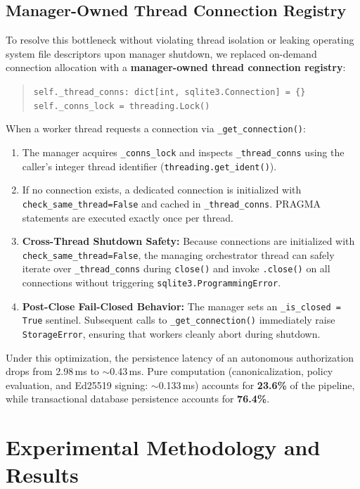\documentclass[sigconf,anonymous,review]{acmart}
\begin{document}
\subsection{Manager-Owned Thread Connection Registry}
To resolve this bottleneck without violating thread isolation or leaking operating system file descriptors upon manager shutdown, we replaced on-demand connection allocation with a \textbf{manager-owned thread connection registry}:
\begin{quote}
\small
\texttt{self.\_thread\_conns: dict[int, sqlite3.Connection] = \{\}}\\
\texttt{self.\_conns\_lock = threading.Lock()}
\end{quote}
When a worker thread requests a connection via \texttt{\_get\_connection()}:
\begin{enumerate}
    \item The manager acquires \texttt{\_conns\_lock} and inspects \texttt{\_thread\_conns} using the caller's integer thread identifier (\texttt{threading.get\_ident()}).
    \item If no connection exists, a dedicated connection is initialized with \texttt{check\_same\_thread=False} and cached in \texttt{\_thread\_conns}. PRAGMA statements are executed exactly once per thread.
    \item \textbf{Cross-Thread Shutdown Safety:} Because connections are initialized with \texttt{check\_same\_thread=False}, the managing orchestrator thread can safely iterate over \texttt{\_thread\_conns} during \texttt{close()} and invoke \texttt{.close()} on all connections without triggering \texttt{sqlite3.ProgrammingError}.
    \item \textbf{Post-Close Fail-Closed Behavior:} The manager sets an \texttt{\_is\_closed = True} sentinel. Subsequent calls to \texttt{\_get\_connection()} immediately raise \texttt{StorageError}, ensuring that workers cleanly abort during shutdown.
\end{enumerate}

Under this optimization, the persistence latency of an autonomous authorization drops from 2.98\,ms to $\sim$0.43\,ms. Pure computation (canonicalization, policy evaluation, and Ed25519 signing: $\sim$0.133\,ms) accounts for \textbf{23.6\%} of the pipeline, while transactional database persistence accounts for \textbf{76.4\%}.

\section{Experimental Methodology and Results}
\end{document}
